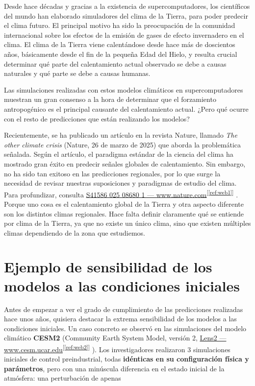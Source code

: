 \documentclass[
  10pt,
  a4paper,
  DIV=11,
  numbers=noendperiod,
  open=any]{scrreprt}
\numberwithin{equation}{chapter}
\numberwithin{equation}{section}
\renewcommand{\[}{\begin{equation}}
\renewcommand{\]}{\end{equation}}
\newcommand{\refweb}[3]{%
  \href{#1}{#2}\textsuperscript{[\ref{ref:#3}]}%
}
\begin{document}
Desde hace décadas y gracias a la existencia de supercomputadores, los
científicos del mundo han elaborado simuladores del clima de la Tierra,
para poder predecir el clima futuro. El principal motivo ha sido la
preocupación de la comunidad internacional sobre los efectos de la
emisión de gases de efecto invernadero en el clima. El clima de la
Tierra viene calentándose desde hace más de doscientos años, básicamente
desde el fin de la pequeña Edad del Hielo, y resulta crucial determinar
qué parte del calentamiento actual observado se debe a causas naturales
y qué parte se debe a causas humanas.

Las simulaciones realizadas con estos modelos climáticos en
supercomputadores muestran un gran consenso a la hora de determinar que
el forzamiento antropogénico es el principal causante del calentamiento
actual. ¿Pero qué ocurre con el resto de predicciones que están
realizando los modelos?

Recientemente, se ha publicado un artículo en la revista Nature, llamado
\emph{The other climate crisis} (Nature, 26 de marzo de 2025) que aborda
la problemática señalada. Según el artículo, el paradigma estándar de la
ciencia del clima ha mostrado gran éxito en predecir señales globales de
calentamiento. Sin embargo, no ha sido tan exitoso en las predicciones
regionales, por lo que surge la necesidad de revisar nuestras suposiciones y
paradigmas de estudio del clima. Para profundizar, consulta
\refweb{https://www.nature.com/articles/s41586-025-08680-1}{S41586 025 08680 1 — www.nature.com}{web1}. Porque uno cosa es el calentamiento global de la Tierra
y otra aspecto diferente son los distintos climas regionales. Hace falta
definir claramente qué se entiende por clima de la Tierra, ya que no existe un único clima, sino que existen múltiples climas dependiendo de la zona que estudiemos.


\section{Ejemplo de sensibilidad de los modelos a las condiciones
iniciales}\label{ejemplo-de-sensibilidad-de-los-modelos-a-las-condiciones-iniciales}

Antes de empezar a ver el grado de cumplimiento de las predicciones realizadas hace unos años, quisiera destacar la extrema sensibilidad de los modelos a las condiciones iniciales. Un caso concreto se observó en las simulaciones del modelo climático
\textbf{CESM2} (Community Earth System Model, versión
2, \refweb{https://www.cesm.ucar.edu/community-projects/lens2}{Lens2 — www.cesm.ucar.edu}{web2} ). Los investigadores realizaron 3
simulaciones iniciales de control preindustrial, todas \textbf{idénticas
en su configuración física y parámetros}, pero con una minúscula
diferencia en el estado inicial de la atmósfera: una perturbación de
apenas
\end{document}
